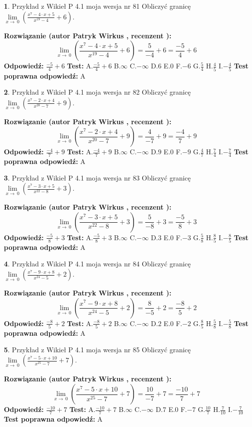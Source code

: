 \documentclass[12pt, a4paper]{article}
\theoremstyle{definition} %
\newtheorem{zad}{}
\newcommand{\zadStart}[1]{\begin{zad}#1\newline}
\newcommand{\zadStop}{\end{zad}}
\newcommand{\rozwStart}[2]{\noindent \textbf{Rozwiązanie (autor #1 , recenzent #2): }\newline}
\newcommand{\rozwStop}{\newline}
\newcommand{\odpStart}{\noindent \textbf{Odpowiedź:}\newline}
\newcommand{\odpStop}{\newline}
\newcommand{\testStart}{\noindent \textbf{Test:}\newline}
\newcommand{\testStop}{\newline}
\newcommand{\kluczStart}{\noindent \textbf{Test poprawna odpowiedź:}\newline}
\newcommand{\kluczStop}{\newline}
\begin{document}
\zadStart{Przykład z Wikieł P 4.1 moja wersja nr 81}
Obliczyć granicę $\lim\limits_{x\to\ 0}(\frac{x^{7}-4 \cdot x +5}{x^{19}-4}+6)$.
\zadStop
\rozwStart{Patryk Wirkus}{}
$$\lim\limits_{x\to\ 0}(\frac{x^{7}-4 \cdot x +5}{x^{19}-4}+6)=\frac{5}{-4}+6=\frac{-5}{4}+6$$
\rozwStop
\odpStart
$\frac{-5}{4}+6$
\odpStop
\testStart
A.$\frac{-5}{4}+6$
B.$\infty$
C.$-\infty$
D.$6$
E.$0$
F.$-6$
G.$\frac{5}{4}$
H.$\frac{4}{5}$
I.$-\frac{4}{5}$
\testStop
\kluczStart
A
\kluczStop



\zadStart{Przykład z Wikieł P 4.1 moja wersja nr 82}
Obliczyć granicę $\lim\limits_{x\to\ 0}(\frac{x^{7}-2 \cdot x +4}{x^{20}-7}+9)$.
\zadStop
\rozwStart{Patryk Wirkus}{}
$$\lim\limits_{x\to\ 0}(\frac{x^{7}-2 \cdot x +4}{x^{20}-7}+9)=\frac{4}{-7}+9=\frac{-4}{7}+9$$
\rozwStop
\odpStart
$\frac{-4}{7}+9$
\odpStop
\testStart
A.$\frac{-4}{7}+9$
B.$\infty$
C.$-\infty$
D.$9$
E.$0$
F.$-9$
G.$\frac{4}{7}$
H.$\frac{7}{4}$
I.$-\frac{7}{4}$
\testStop
\kluczStart
A
\kluczStop



\zadStart{Przykład z Wikieł P 4.1 moja wersja nr 83}
Obliczyć granicę $\lim\limits_{x\to\ 0}(\frac{x^{7}-3 \cdot x +5}{x^{22}-8}+3)$.
\zadStop
\rozwStart{Patryk Wirkus}{}
$$\lim\limits_{x\to\ 0}(\frac{x^{7}-3 \cdot x +5}{x^{22}-8}+3)=\frac{5}{-8}+3=\frac{-5}{8}+3$$
\rozwStop
\odpStart
$\frac{-5}{8}+3$
\odpStop
\testStart
A.$\frac{-5}{8}+3$
B.$\infty$
C.$-\infty$
D.$3$
E.$0$
F.$-3$
G.$\frac{5}{8}$
H.$\frac{8}{5}$
I.$-\frac{8}{5}$
\testStop
\kluczStart
A
\kluczStop



\zadStart{Przykład z Wikieł P 4.1 moja wersja nr 84}
Obliczyć granicę $\lim\limits_{x\to\ 0}(\frac{x^{7}-9 \cdot x +8}{x^{24}-5}+2)$.
\zadStop
\rozwStart{Patryk Wirkus}{}
$$\lim\limits_{x\to\ 0}(\frac{x^{7}-9 \cdot x +8}{x^{24}-5}+2)=\frac{8}{-5}+2=\frac{-8}{5}+2$$
\rozwStop
\odpStart
$\frac{-8}{5}+2$
\odpStop
\testStart
A.$\frac{-8}{5}+2$
B.$\infty$
C.$-\infty$
D.$2$
E.$0$
F.$-2$
G.$\frac{8}{5}$
H.$\frac{5}{8}$
I.$-\frac{5}{8}$
\testStop
\kluczStart
A
\kluczStop



\zadStart{Przykład z Wikieł P 4.1 moja wersja nr 85}
Obliczyć granicę $\lim\limits_{x\to\ 0}(\frac{x^{7}-5 \cdot x +10}{x^{25}-7}+7)$.
\zadStop
\rozwStart{Patryk Wirkus}{}
$$\lim\limits_{x\to\ 0}(\frac{x^{7}-5 \cdot x +10}{x^{25}-7}+7)=\frac{10}{-7}+7=\frac{-10}{7}+7$$
\rozwStop
\odpStart
$\frac{-10}{7}+7$
\odpStop
\testStart
A.$\frac{-10}{7}+7$
B.$\infty$
C.$-\infty$
D.$7$
E.$0$
F.$-7$
G.$\frac{10}{7}$
H.$\frac{7}{10}$
I.$-\frac{7}{10}$
\testStop
\kluczStart
A
\kluczStop
\end{document}
